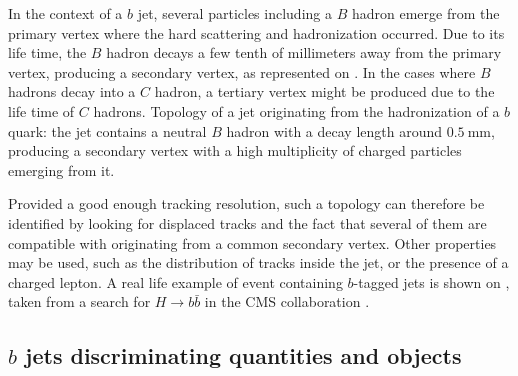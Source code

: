     In the context of a $b$ jet, several particles including a $B$ hadron emerge
    from the primary vertex where the hard scattering and hadronization
    occurred. Due to its life time, the $B$ hadron decays a few tenth of
    millimeters away from the primary vertex, producing a secondary vertex, as
    represented on .  In the cases where $B$
    hadrons decay into a $C$ hadron, a tertiary vertex might be produced due to
    the life time of $C$ hadrons.
                 {Topology of a jet originating from the hadronization of a $b$
                 quark: the jet contains a neutral $B$ hadron with a decay
                 length around $0.5~\text{mm}$, producing a secondary vertex
                 with a high multiplicity of charged particles emerging from
                 it.}

    Provided a good enough tracking resolution, such a topology can therefore be
    identified by looking for displaced tracks and the fact that several of them
    are compatible with originating from a common secondary vertex. Other
    properties may be used, such as the distribution of tracks inside the jet,
    or the presence of a charged lepton. A real life example of event containing
    $b$-tagged jets is shown on , taken
    from a search for $H\rightarrow b\bar{b}$ in the CMS collaboration
    \cite{HIG-13-011}.


    \subsection{$b$ jets discriminating quantities and objects}


